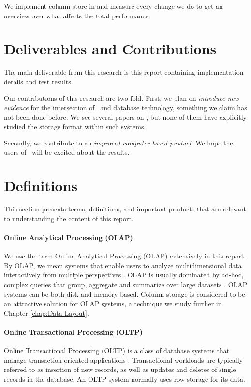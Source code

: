We implement column store in \gap and measure every change we do to get an overview over what affects the total performance.


\section{Deliverables and Contributions}
\label{sec:Deliverables and Contributions}
The main deliverable from this research is this report containing implementation details and test results.

Our contributions of this research are two-fold. First, we plan on \textit{introduce new evidence} for the intersection of \mdd~and database technology, something we claim has not been done before. We see several papers on \mdd, but none of them have explicitly studied the storage format within such systems.

Secondly, we contribute to an \textit{improved computer-based product}. We hope the users of \gap~will be excited about the results.


\section{Definitions}
\label{sec:Definitions}
This section presents terms, definitions, and important products that are relevant to understanding the content of this report.

\paragraph{Online Analytical Processing (OLAP)}
\label{par:Online Analytical Processing (OLAP)}
  We use the term Online Analytical Processing (OLAP) extensively in this report. By OLAP, we mean systems that enable users to analyze multidimensional data interactively from multiple perspectives \cite{Wikipedia_contributors2015-hw}. OLAP is usually dominated by ad-hoc, complex queries that group, aggregate and summarize over large datasets \cite{Bjorklund2011-wh}. OLAP systems can be both disk and memory based. Column storage is considered to be an attractive solution for OLAP systems, a technique we study further in Chapter \ref{chap:Data Layout}.


\paragraph{Online Transactional Processing (OLTP)}
\label{par:Online Transactional Processing (OLTP)}
Online Transactional Processing (OLTP) is a class of database systems that manage transaction-oriented applications \cite{Wikipedia_contributors2015-cw}. Transactional workloads are typically referred to as insertion of new records, as well as updates and deletes of single records in the database. An OLTP system normally uses row storage for its data.

